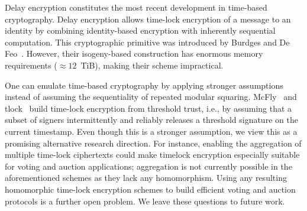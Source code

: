 Delay encryption constitutes the most recent development in time-based cryptography. Delay encryption allows time-lock encryption of a message to an identity by combining identity-based encryption with inherently sequential computation. This cryptographic primitive was introduced by Burdges and De Feo~\cite{burdges2021delay}. However, their isogeny-based construction has enormous memory requirements ($\approx 12$\ TiB), making their scheme impractical.

One can emulate time-based cryptography by applying stronger assumptions instead of assuming the sequentiality of repeated modular squaring. McFly~\cite{dottling2023mcfly} and tlock~\cite{gailly2023tlock} build time-lock encryption from threshold trust, i.e., by assuming that a subset of signers intermittently and reliably releases a threshold signature on the current timestamp. Even though this is a stronger assumption, we view this as a promising alternative research direction. For instance, enabling the aggregation of multiple time-lock ciphertexts could make timelock encryption especially suitable for voting and auction applications; aggregation is not currently possible in the aforementioned schemes as they lack any homomorphism. 
Using any resulting homomorphic time-lock encryption schemes to build efficient voting and auction protocols is a further open problem.
We leave these questions to future work. 


